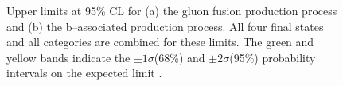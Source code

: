 \begin{figure}[h!]
\begin{center}
\end{center}
\caption{Upper limits at 95\% CL for (a) the gluon fusion production
process and (b) the b--associated production process. All four final states and 
all categories are combined for these limits. The green and yellow bands indicate
the $\pm 1\sigma$(68\%) and $\pm 2\sigma$(95\%) probability intervals on the expected limit  \cite{CMS-PAS-HIG-16-006}.}
\label{fig:mssm_results_hig16006_limits}
\end{figure}

